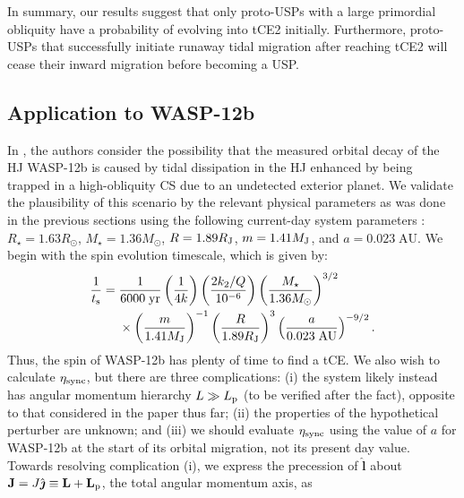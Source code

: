 \documentclass[
        fleqn,
        usenatbib,
    ]{mnras}
\newcommand*{\p}[1]{\left(#1\right)}
\newcommand*{\bm}[1]{\mathbf{#1}}
\newcommand*{\uv}[1]{\hat{\boldsymbol{\mathbf{#1}}}}
\begin{document}
In summary, our results suggest that only proto-USPs with a large primordial
obliquity have a probability of evolving into tCE2 initially. Furthermore,
proto-USPs that successfully initiate runaway tidal migration after reaching
tCE2 will cease their inward migration before becoming a USP\@.

\subsection{Application to WASP-12b}\label{ss:disc_wasp12b}

In \citet{millholland2019obliquity}, the authors consider the possibility that
the measured orbital decay of the HJ WASP-12b \citep[$P / \dot{P} = -3.2
\;\mathrm{Myr}$; ][]{maciejewski2016departure, patra2017apparently} is caused by
tidal dissipation in the HJ enhanced by being trapped in a high-obliquity CS due
to an undetected exterior planet. We validate the plausibility of this scenario
by the relevant physical parameters as was done in the previous sections using
the following current-day system parameters \citet{hebb2009wasp,
maciejewski2013multi, millholland_wasp12b}: $R_\star = 1.63R_{\odot}$, $M_\star
= 1.36M_{\odot}$, $R = 1.89R_{\rm J}$, $m = 1.41M_{\rm J}$, and $a = 0.023
\;\mathrm{AU}$. We begin with the spin evolution timescale, which is given by:
\begin{align}
    \frac{1}{t_{\rm s}} ={}& \frac{1}{6000\;\mathrm{yr}}
            \p{\frac{1}{4k}}
            \p{\frac{2k_2/Q}{10^{-6}}}
            \p{\frac{M_\star}{1.36 M_{\odot}}}^{3/2}\nonumber\\
        &\times \p{\frac{m}{1.41 M_{\rm J}}}^{-1}
            \p{\frac{R}{1.89 R_{\rm J}}}^{3}
            \p{\frac{a}{0.023\;\mathrm{AU}}}^{-9/2}.
\end{align}
Thus, the spin of WASP-12b has plenty of time to find a tCE\@. We also wish to
calculate $\eta_{\rm sync}$, but there are three complications: (i) the system
likely instead has angular momentum hierarchy $L \gg L_{\rm p}$ (to be verified
after the fact), opposite to that considered in the paper thus far; (ii) the
properties of the hypothetical perturber are unknown; and (iii) we should
evaluate $\eta_{\rm sync}$ using the value of $a$ for WASP-12b at the start of
its orbital migration, not its present day value. Towards resolving complication
(i), we express the precession of $\uv{l}$ about $\bm{J} = J\uv{\jmath} \equiv
\bm{L} + \bm{L}_{\rm p}$, the total angular momentum axis, as
\end{document}
